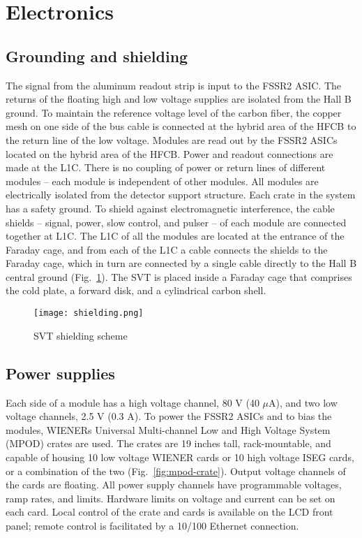 \section{Electronics}

\subsection{Grounding and shielding}

The signal from the aluminum readout strip is input to the FSSR2 ASIC. The returns of the floating high and low voltage supplies are isolated from the Hall B ground. To maintain the reference voltage level of the carbon fiber, the copper mesh on one side of the bus cable is connected at the hybrid area of the HFCB to the return line of the low voltage. Modules are read out by the FSSR2 ASICs located on the hybrid area of the HFCB. Power and readout connections are made at the L1C. There is no coupling of power or return lines of different modules -- each module is independent of other modules. All modules are electrically isolated from the detector support structure. 
Each crate in the system has a safety ground. To shield against electromagnetic interference, the cable shields -- signal, power, slow control, and pulser -- of each module are connected together at L1C. The L1C of all the modules are located at the entrance of the Faraday cage, and from each of the L1C a cable connects the shields to the Faraday cage, which in turn are connected by a single cable directly to the Hall B central ground (Fig.~\ref{fig:shielding}). The SVT is placed inside a Faraday cage that comprises the cold plate, a forward disk, and a cylindrical carbon shell.

\begin{figure}[hbt] 
\centering 
\texttt{[image: shielding.png]}
\caption{SVT shielding scheme}
\label{fig:shielding}
\end{figure}

\subsection{Power supplies}

Each side of a module has a high voltage channel, 80 V (40 $\mu$A), and two low voltage channels, 2.5 V (0.3 A). To power the FSSR2 ASICs and to bias the modules, WIENERs Universal Multi-channel Low and High Voltage System (MPOD) crates are used. The crates are 19 inches tall, rack-mountable, and capable of housing 10 low voltage WIENER cards or 10 high voltage ISEG cards, or a combination of the two (Fig.~\ref{fig:mpod-crate}). Output voltage channels of the cards are floating. All power supply channels have programmable voltages, ramp rates, and limits. Hardware limits on voltage and current can be set on each card. Local control of the crate and cards is available on the LCD front panel; remote control is facilitated by a 10/100 Ethernet connection. 


